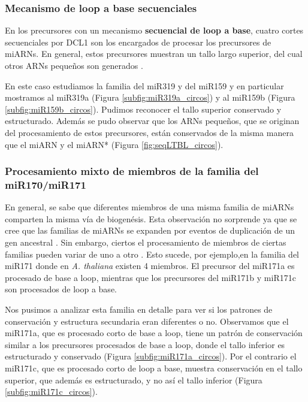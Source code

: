 \subsubsection{Mecanismo de loop a base secuenciales}

En los precursores con un mecanismo \textbf{secuencial de loop a base}, cuatro cortes secuenciales por DCL1 son los encargados de procesar los precursores de miARNs.
En general, estos precursores muestran un tallo largo superior, del cual otros ARNs pequeños son generados \citep{pmid19850910,Bologna2009,Bologna2013}.

En este caso estudiamos la familia del miR319 y del miR159 y en particular mostramos al miR319a (Figura \ref{subfig:miR319a_circos}) y al miR159b (Figura \ref{subfig:miR159b_circos}).
Pudimos reconocer el tallo superior conservado y estructurado.
Además se pudo observar que los ARNs pequeños, que se originan del procesamiento de estos precursores, están conservados de la misma manera que el miARN y el miARN* (Figura \ref{fig:seqLTBL_circos}).


\subsubsection{Procesamiento mixto de miembros de la familia del miR170/miR171}

En general, se sabe que diferentes miembros de una misma familia de miARNs comparten la misma vía de biogenésis. 
Esta observación no sorprende ya que se cree que las familias de miARNs se expanden por eventos de duplicación de un gen ancestral \citep{pmid15565108}.
Sin embargo, ciertos el procesamiento de miembros de ciertas familias pueden variar de uno a otro \citep{Bologna2013}.
Esto sucede, por ejemplo,en la familia del miR171 donde en \textit{A. thaliana} existen 4 miembros. 
El precursor del miR171a es procesado de base a loop, mientras que los precursores del miR171b y miR171c son procesados de loop a base.

Nos pusimos a analizar esta familia en detalle para ver si los patrones de conservación y estructura secundaria eran diferentes o no.
Observamos que el miR171a, que es procesado corto de base a loop, tiene un patrón de conservación similar a los precursores procesados de base a loop, donde el tallo inferior es estructurado y conservado (Figura \ref{subfig:miR171a_circos}).
Por el contrario el miR171c, que es procesado corto de loop a base, muestra conservación en el tallo superior, que además es estructurado, y no así el tallo inferior (Figura \ref{subfig:miR171c_circos}).


